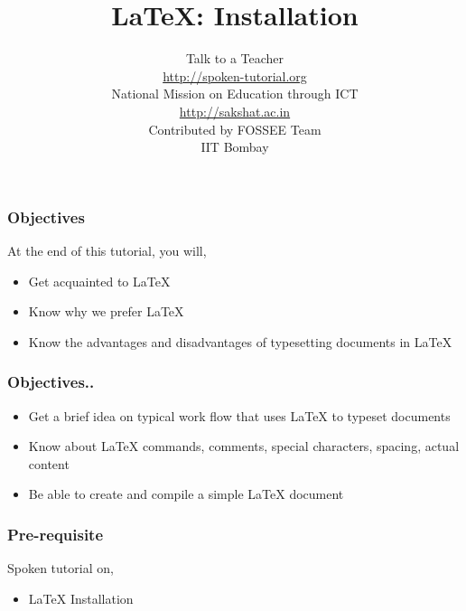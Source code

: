 \documentclass[17pt,compress]{beamer}
\author[FOSSEE]{}
\institute[IIT Bombay]{}
\date[]{}
\begin{document}
\sffamily \bfseries
\title
[\LaTeX: \:Installation]
{\LaTeX: \:Installation}
\author
[FOSSEE]
{\small Talk to a Teacher\\{\color{blue}\url{http://spoken-tutorial.org}}
\\\vspace{0.25cm}National Mission on Education
 through ICT\\{\color{blue}\url{ http://sakshat.ac.in}} \\ [1.65cm]
   Contributed by FOSSEE Team \\IIT Bombay  \\[0.3cm]
}

\begin{frame}
   \titlepage
\end{frame}

\begin{frame}
\frametitle{Objectives}
\label{sec-2}

At the end of this tutorial, you will,
\begin{itemize}
\item Get acquainted to LaTeX
\item Know why we prefer LaTeX
\item Know the advantages and disadvantages of typesetting documents in LaTeX
\end{itemize}
\end{frame}

\begin{frame}
\frametitle{Objectives..}
\label{sec-2}

\begin{itemize}
\item Get a brief idea on typical work flow that uses LaTeX to typeset
documents
\item Know about LaTeX commands, comments,
      special characters, spacing, actual content
\item Be able to create and compile a simple LaTeX document
\end{itemize}
\end{frame}

\begin{frame}
\frametitle{Pre-requisite}
\label{sec-3}

  Spoken tutorial on, 

\begin{itemize}
\item {\LaTeX} Installation
\end{itemize}
\end{frame}
\end{document}
